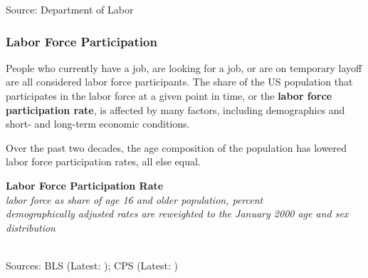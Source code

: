 \documentclass{report}
\makeatletter
\newcommand{\tbllink}[1]{\href{https://raw.githubusercontent.com/bdecon/US-chartbook/master/chartbook/data/#1}{\faTable}}
\newcommand*\short[1]{\expandafter\@gobbletwo\number\numexpr#1\relax}
\newcommand{\absnode}[3]{\node[below right, align=left] at (axis cs: #1,#2) {#3};}
\newcommand{\dateaxisticks}{
		date coordinates in=x, axis line style={draw=none},
		xmax={2023-10-01},
		max space between ticks=40,	    
		xtick={{1990-01-01}, {1992-01-01}, {1994-01-01}, 
			{1996-01-01}, {1998-01-01}, {2000-01-01}, 
			{2002-01-01}, {2004-01-01}, {2006-01-01},
			{2008-01-01}, {2010-01-01}, {2012-01-01}, {2014-01-01},
		    {2016-01-01}, {2018-01-01}, {2020-01-01}, {2022-01-01}, 
		    {2024-01-01}, {2026-01-01}},
		minor xtick={{1989-01-01}, {1991-01-01}, {1993-01-01},
			{1995-01-01}, {1997-01-01}, {1999-01-01}, 
			{2001-01-01}, {2003-01-01}, {2005-01-01}, {2007-01-01},
		    {2009-01-01}, {2011-01-01}, {2013-01-01}, {2015-01-01},
		    {2017-01-01}, {2019-01-01}, {2021-01-01}, {2023-01-01}, 
		    {2025-01-01}, {2027-01-01}},
		enlarge y limits={0.06}, enlarge x limits={0.01},
		}
\newcommand{\bbar}[2]{extra #1 ticks = {{#2}}, extra #1 tick labels = ,
		extra #1 tick style = {grid=major, grid style={thick, black!25}},}
\newcommand{\stdline}[4]{\addplot[very thick, no markers, color=#1] 
		table [x=#2, y=#3, col sep=comma] {#4};	}
\newcommand{\rbars}{
		\fill[color=black!10] (axis cs:{1990-07-01},\pgfkeysvalueof{/pgfplots/ymin}) rectangle 
			(axis cs:{1991-03-01}, \pgfkeysvalueof{/pgfplots/ymax});
		\fill[color=black!10] (axis cs:{2007-12-01},\pgfkeysvalueof{/pgfplots/ymin}) rectangle 
			(axis cs:{2009-07-01}, \pgfkeysvalueof{/pgfplots/ymax});
		\fill[color=black!10] (axis cs:{2001-03-01},\pgfkeysvalueof{/pgfplots/ymin}) rectangle 
			(axis cs:{2001-11-01}, \pgfkeysvalueof{/pgfplots/ymax});
		\fill[color=black!10] (axis cs:{2020-02-01},\pgfkeysvalueof{/pgfplots/ymin}) rectangle 
			(axis cs:{2020-05-01}, \pgfkeysvalueof{/pgfplots/ymax});}
\makeatother
\begin{document}
{\begin{minipage}{0.76\textwidth}
\footnotesize{Source: Department of Labor}
\end{minipage}
\newpage
\hypertarget{labp}{\label{labp}}
\begin{minipage}{0.76\textwidth} 
\subsubsection*{Labor Force Participation}
\small People who currently have a job, are looking for a job, or are on temporary layoff are all considered labor force participants. The share of the US population that participates in the labor force at a given point in time, or the \textbf{labor force participation rate}, is affected by many factors, including demographics and short- and long-term economic conditions.

Over the past two decades, the age composition of the population has lowered labor force participation rates, all else equal. 


\vspace{2mm}

\normalsize \textbf{Labor Force Participation Rate}\\
\footnotesize{\textit{labor force as share of age 16 and older population, percent\\demographically adjusted rates are reweighted to the January 2000 age and sex distribution}}\\
\hspace*{-2mm} \\
\footnotesize{Sources: BLS (Latest: \unskip); CPS (Latest: \unskip)} \hfill \tbllink{lfpr.csv}
\end{minipage}
\newpage
\begin{minipage}{0.76\textwidth} 

\end{minipage}}
\end{document}
